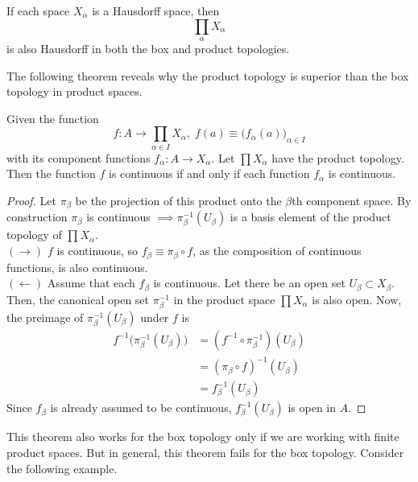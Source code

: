     \begin{theorem}
      If each space $X_\alpha$ is a Hausdorff space, then 
      \begin{equation}
        \prod_{\alpha} X_\alpha
      \end{equation}
      is also Hausdorff in both the box and product topologies. 
    \end{theorem}

    The following theorem reveals why the product topology is superior than the box topology in product spaces. 

    \begin{theorem}
      Given the function 
      \begin{equation}
        f: A \longrightarrow \prod_{\alpha \in I} X_\alpha, \; f(a) \equiv \big( f_\alpha (a) \big)_{\alpha \in I}
      \end{equation}
      with its component functions $f_\alpha: A \longrightarrow X_\alpha$. Let $\prod X_\alpha$ have the product topology. Then the function $f$ is continuous if and only if each function $f_\alpha$ is continuous. 
    \end{theorem}
    \begin{proof}
      Let $\pi_\beta$ be the projection of this product onto the $\beta$th component space. By construction $\pi_\beta$ is continuous $\implies \pi_\beta^{-1} (U_\beta)$ is a basis element of the product topology of $\prod X_\alpha$. \\
      $(\rightarrow)$ $f$ is continuous, so $f_\beta \equiv \pi_\beta \circ f$, as the composition of continuous functions, is also continuous. \\
      $(\leftarrow)$ Assume that each $f_\beta$ is continuous. Let there be an open set $U_\beta \subset X_\beta$. Then, the canonical open set $\pi_\beta^{-1}$ in the product space $\prod X_\alpha$ is also open. Now, the preimage of $\pi_\beta^{-1} (U_\beta)$ under $f$ is 
      \begin{align*}
        f^{-1} \big( \pi_\beta^{-1} (U_\beta)\big) & = (f^{-1} \circ \pi_\beta^{-1})(U_\beta) \\
        & = (\pi_\beta \circ f)^{-1} (U_\beta) \\
        & = f_\beta^{-1} (U_\beta)
      \end{align*}
      Since $f_\beta$ is already assumed to be continuous, $f_\beta^{-1} (U_\beta)$ is open in $A$. 
    \end{proof}

    This theorem also works for the box topology only if we are working with finite product spaces. But in general, this theorem fails for the box topology. Consider the following example. 

